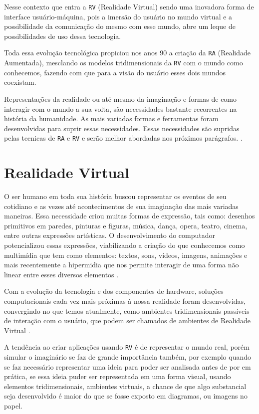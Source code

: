 Nesse contexto que entra a \verb'RV' (Realidade Virtual) sendo uma inovadora forma de interface
usuário-máquina, pois a imersão do usuário no mundo virtual e a possibilidade da comunicação do mesmo com esse
mundo, abre um leque de possibilidades de uso dessa tecnologia.

Toda essa evolução tecnológica propiciou nos anos 90 a criação da \verb'RA' (Realidade Aumentada), mesclando
os modelos tridimensionais da \verb'RV' com o mundo como conhecemos, fazendo com que para a visão do usuário
esses dois mundos coexistam.

Representações da realidade ou até mesmo da imaginação e formas de como interagir com o mundo a sua volta, são
necessidades bastante recorrentes na história da humanidade. As mais variadas formas e ferramentas foram
desenvolvidas para suprir essas necessidades. Essas necessidades são supridas pelas tecnicas de \verb'RA' e
\verb'RV' e serão melhor abordadas nos próximos parágrafos. \cite{kirner2007,kirner2006}.

\section {Realidade Virtual}
O ser humano em toda sua história buscou representar os eventos de seu cotidiano e as vezes até acontecimentos
de sua imaginação das mais variadas maneiras. Essa necessidade criou muitas formas de expressão, tais como:
desenhos primitivos em paredes, pinturas e figuras, música, dança, opera, teatro, cinema, entre outras
expressões artísticas. O desenvolvimento do computador potencializou essas expressões, viabilizando a criação
do que conhecemos como multimídia que tem como elementos: textos, sons, vídeos, imagens, animações e mais
recentemente a hipermidia que nos permite interagir de uma forma não linear entre esses diversos
elementos \cite{kirner2006}.

Com a evolução da tecnologia e dos componentes de hardware, soluções computacionais cada vez mais próximas à
nossa realidade foram desenvolvidas, convergindo no que temos atualmente, como ambientes tridimensionais
passíveis de interação com o usuário, que podem ser chamados de ambientes de Realidade Virtual
\cite{kirner2006}.

A tendência ao criar aplicações usando \verb'RV' é de representar o mundo real, porém simular o imaginário se
faz de grande importância também, por exemplo quando se faz necessário representar uma ideia para poder ser
analisada antes de por em prática, se essa ideia puder ser representada em uma forma visual, usando elementos
tridimensionais, ambientes virtuais, a chance de que algo substancial seja desenvolvido é maior do que se
fosse exposto em diagramas, ou imagens no papel.

